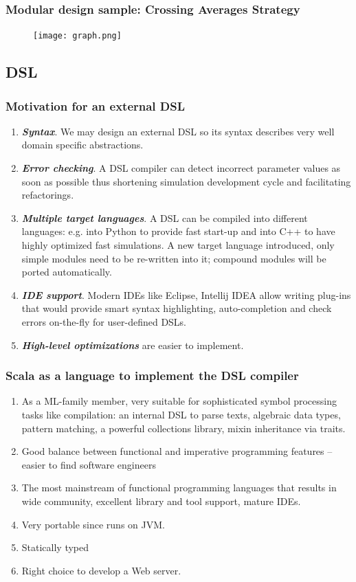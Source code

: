 \documentclass{beamer}
\begin{document}
\begin{frame}
\frametitle{Modular design sample: Crossing Averages Strategy}
\begin{figure}[htbp]
\centering
\texttt{[image: graph.png]}
\end{figure}
\end{frame}
\subsection{DSL}
\begin{frame}
\frametitle{Motivation for an external DSL}
\begin{enumerate}
  \item \textbf{\textit{Syntax}}. We may design an external DSL so its syntax describes very well domain specific abstractions.
  \item \textbf{\textit{Error checking}}. A DSL compiler can detect incorrect parameter values as soon as possible thus shortening simulation development cycle and facilitating refactorings.
  \item \textbf{\textit{Multiple target languages}}. A DSL can be compiled into different languages: e.g. into Python to provide fast start-up and into C++ to have highly optimized fast simulations. A new target language introduced, only simple modules need to be re-written into it; compound modules will be ported automatically.
  \item \textbf{\textit{IDE support}}. Modern IDEs like Eclipse, Intellij IDEA allow writing plug-ins that would provide smart syntax highlighting, auto-completion and check errors on-the-fly for user-defined DSLs.
  \item \textbf{\textit{High-level optimizations}} are easier to implement. 
\end{enumerate}
\end{frame}
\begin{frame}
\frametitle{Scala as a language to implement the DSL compiler}
\begin{enumerate}
  \item As a ML-family member, very suitable for sophisticated symbol processing tasks like compilation: an internal DSL to parse texts, algebraic data types, pattern matching, a powerful collections library, mixin inheritance via traits.
  \item Good balance between functional and imperative programming features -- easier to find software engineers
  \item The most mainstream of functional programming languages that results in wide community, excellent library and tool support, mature IDEs.
  \item Very portable since runs on JVM.
  \item Statically typed
  \item Right choice to develop a Web server.
\end{enumerate}
\end{frame}
\end{document}
